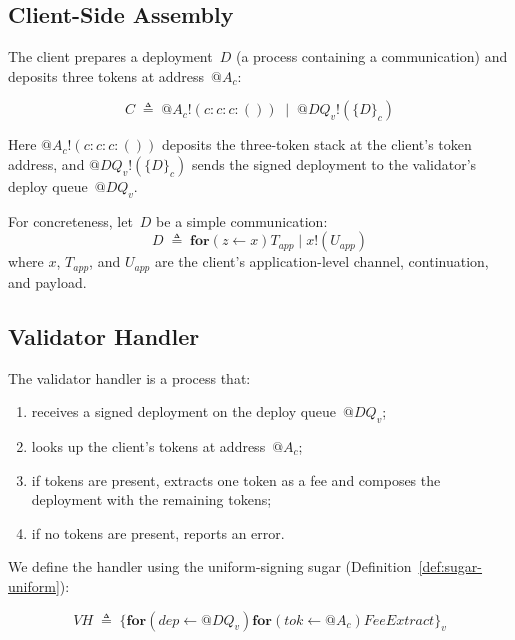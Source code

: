 \documentclass[11pt,a4paper]{article}
\makeatletter
\newcommand{\Par}{\mathbin{|}}
\newcommand{\forc}{\mathbf{for}}
\newcommand{\send}[2]{#1 !\!\left( #2 \right)}
\newcommand{\recv}[3]{\forc\!\left( #1 \leftarrow #2 \right) #3}
\newcommand{\quot}[1]{@#1}
\newcommand{\signed}[2]{\{#1\}_{#2}}
\makeatother
\begin{document}
\subsection{Client-Side Assembly}
\label{app:ex-client}

The client prepares a deployment~$D$ (a process containing a
communication) and deposits three tokens at address~$\quot{A_c}$:

\begin{equation}
  \boxed{
    C
    \;\triangleq\;
    \send{\quot{A_c}}{c : c : c : ()}
    \;\Par\;
    \send{\quot{DQ_v}}{\signed{D}{c}}
  }
  \label{eq:client-assembly}
\end{equation}

\noindent
Here $\send{\quot{A_c}}{c : c : c : ()}$ deposits the
three-token stack at the client's token address, and
$\send{\quot{DQ_v}}{\signed{D}{c}}$ sends the signed deployment to
the validator's deploy queue~$\quot{DQ_v}$.

For concreteness, let~$D$ be a simple communication:
\begin{equation}
  D \;\triangleq\;
  \recv{z}{x}{T_{\mathit{app}}} \Par \send{x}{U_{\mathit{app}}}
  \label{eq:deploy-body}
\end{equation}
where $x$, $T_{\mathit{app}}$, and $U_{\mathit{app}}$ are the
client's application-level channel, continuation, and payload.

\subsection{Validator Handler}
\label{app:ex-validator}

The validator handler is a process that:
\begin{enumerate}[nosep]
  \item receives a signed deployment on the deploy
    queue~$\quot{DQ_v}$;
  \item looks up the client's tokens at address~$\quot{A_c}$;
  \item if tokens are present, extracts one token as a fee and
    composes the deployment with the remaining tokens;
  \item if no tokens are present, reports an error.
\end{enumerate}

\noindent
We define the handler using the uniform-signing sugar
(Definition~\ref{def:sugar-uniform}):

\begin{equation}
  \boxed{
    \mathit{VH}
    \;\triangleq\;
    \signed{
      \recv{\mathit{dep}}{\quot{DQ_v}}{
        \recv{\mathit{tok}}{\quot{A_c}}{
          \mathit{FeeExtract}
        }
      }
    }{v}
  }
  \label{eq:validator-handler}
\end{equation}
\end{document}
